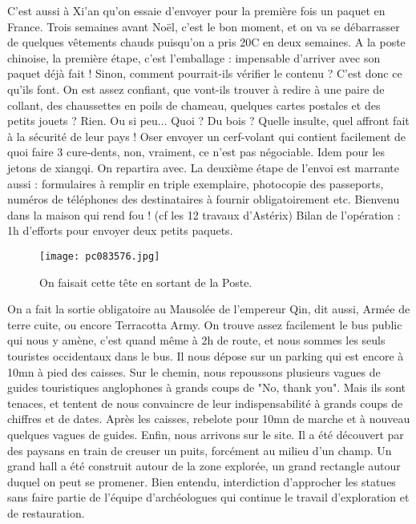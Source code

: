 \documentclass{book}
\begin{document}
C'est aussi à Xi'an qu'on essaie d'envoyer pour la première fois un paquet en France. Trois semaines avant Noël, c'est le bon moment, et on va se débarrasser de quelques vêtements chauds puisqu'on a pris 20\textdegree C en deux semaines. A la poste chinoise, la première étape, c'est l'emballage : impensable d'arriver avec son paquet déjà fait ! Sinon, comment pourrait-ils vérifier le contenu ? C'est donc ce qu'ils font. On est assez confiant, que vont-ils trouver à redire à une paire de collant, des chaussettes en poils de chameau, quelques cartes postales et des petits jouets ? Rien. Ou si peu... Quoi ? Du bois ? Quelle insulte, quel affront fait à la sécurité de leur pays ! Oser envoyer un cerf-volant qui contient facilement de quoi faire 3 cure-dents, non, vraiment, ce n'est pas négociable. Idem pour les jetons de xiangqi. On repartira avec. La deuxième étape de l'envoi est marrante aussi : formulaires à remplir en triple exemplaire, photocopie des passeports, numéros de téléphones des destinataires à fournir obligatoirement etc. Bienvenu dans la maison qui rend fou ! (cf les 12 travaux d'Astérix) Bilan de l'opération : 1h d'efforts pour envoyer deux petits paquets.


\begin{figure}[h]
\centering
\texttt{[image: pc083576.jpg]}
\caption*{On faisait cette tête en sortant de la Poste.}
\end{figure}

On a fait la sortie obligatoire au Mausolée de l'empereur Qin, dit aussi, Armée de terre cuite, ou encore Terracotta Army. On trouve assez facilement le bus public qui nous y amène, c'est quand même à 2h de route, et nous sommes les seuls touristes occidentaux dans le bus. Il nous dépose sur un parking qui est encore à 10mn à pied des caisses. Sur le chemin, nous repoussons plusieurs vagues de guides touristiques anglophones à grands coups de "No, thank you". Mais ils sont tenaces, et tentent de nous convaincre de leur indispensabilité à grands coups de chiffres et de dates. Après les caisses, rebelote pour 10mn de marche et à nouveau quelques vagues de guides. Enfin, nous arrivons sur le site. Il a été découvert par des paysans en train de creuser un puits, forcément au milieu d'un champ. Un grand hall a été construit autour de la zone explorée, un grand rectangle autour duquel on peut se promener. Bien entendu, interdiction d'approcher les statues sans faire partie de l'équipe d'archéologues qui continue le travail d'exploration et de restauration.
\end{document}
